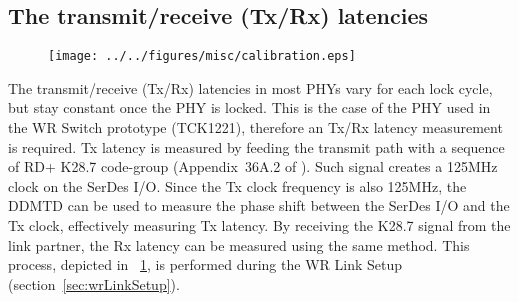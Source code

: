 
\subsection{The transmit/receive (Tx/Rx) latencies} 
\label{sec:TxRxLatencies}

\begin{figure}[!t]
\centering
\texttt{[image: ../../figures/misc/calibration.eps]}
\caption{}
\label{fig:calibration}
\end{figure}

The transmit/receive (Tx/Rx) latencies in most PHYs vary for
each  
lock cycle, but stay constant once the PHY is
locked. This is the case of the PHY used in the WR Switch prototype
(TCK1221), therefore an Tx/Rx latency measurement is required. Tx
latency is measured by feeding the transmit path with a sequence of
RD+ K28.7 code-group (Appendix~36A.2 of \cite{biblio:IEEE8023}). 
Such signal creates a 125MHz clock on
the SerDes I/O. Since the Tx clock frequency is also 125MHz, the DDMTD
can be used to measure the phase shift between the SerDes I/O and the
Tx clock, effectively measuring Tx latency. By receiving the K28.7
signal from the link partner, the Rx latency can be measured using the
same method. This process, depicted in \figurename~\ref{fig:calibration},
is performed during the WR Link Setup (section~\ref{sec:wrLinkSetup}).


